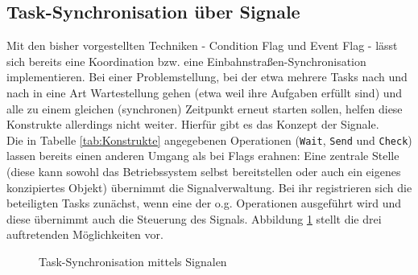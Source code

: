 \documentclass{llncs}
\begin{document}
\subsection{Task-Synchronisation über Signale}
\label{subsec:Task_Synchronisation_Signale}
Mit den bisher vorgestellten Techniken - Condition Flag und Event Flag - lässt sich bereits eine Koordination bzw. eine Einbahnstraßen-Synchronisation implementieren. Bei einer Problemstellung, bei der etwa mehrere Tasks nach und nach in eine Art Wartestellung gehen (etwa weil ihre Aufgaben erfüllt sind) und alle zu einem gleichen (synchronen) Zeitpunkt erneut starten sollen, helfen diese Konstrukte allerdings nicht weiter. Hierfür gibt es das Konzept der Signale.\\

Die in Tabelle \ref{tab:Konstrukte} angegebenen Operationen (\texttt{Wait}, \texttt{Send} und \texttt{Check}) lassen bereits einen anderen Umgang als bei Flags erahnen: Eine zentrale Stelle (diese kann sowohl das Betriebssystem selbst bereitstellen oder auch ein eigenes konzipiertes Objekt) übernimmt die Signalverwaltung. Bei ihr registrieren sich die beteiligten Tasks zunächst, wenn eine der o.g. Operationen ausgeführt wird und diese übernimmt auch die Steuerung des Signals. Abbildung \ref{fig:Signale_gesamt} stellt die drei auftretenden Möglichkeiten vor.

\begin{figure}[h]
	\centering
	\begin{subfigure}{.40\columnwidth} %
		\def\svgwidth{\columnwidth}
		
	\end{subfigure}
	\caption{\label{fig:Signale_gesamt}Task-Synchronisation mittels Signalen \autocite[vgl.][90]{Cooling2017}}
\end{figure}
\end{document}
